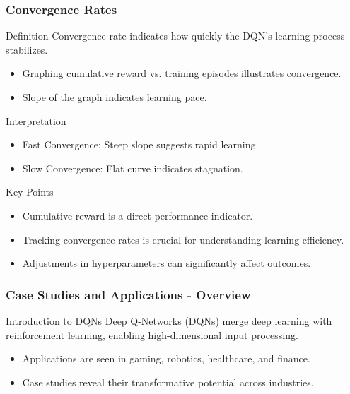 \documentclass{beamer}
\begin{document}
\begin{frame}[fragile]
    \frametitle{Convergence Rates}
    \begin{block}{Definition}
        Convergence rate indicates how quickly the DQN's learning process stabilizes.
    \end{block}
    \begin{itemize}
        \item Graphing cumulative reward vs. training episodes illustrates convergence.
        \item Slope of the graph indicates learning pace.
    \end{itemize}
    
    \begin{block}{Interpretation}
        \begin{itemize}
            \item Fast Convergence: Steep slope suggests rapid learning.
            \item Slow Convergence: Flat curve indicates stagnation.
        \end{itemize}
    \end{block}
    
    \begin{block}{Key Points}
        \begin{itemize}
            \item Cumulative reward is a direct performance indicator.
            \item Tracking convergence rates is crucial for understanding learning efficiency.
            \item Adjustments in hyperparameters can significantly affect outcomes.
        \end{itemize}
    \end{block}
\end{frame}

\begin{frame}
    \frametitle{Case Studies and Applications - Overview}
    \begin{block}{Introduction to DQNs}
        Deep Q-Networks (DQNs) merge deep learning with reinforcement learning, enabling high-dimensional input processing.
    \end{block}
    
    \begin{itemize}
        \item Applications are seen in gaming, robotics, healthcare, and finance.
        \item Case studies reveal their transformative potential across industries.
    \end{itemize}
\end{frame}
\end{document}
